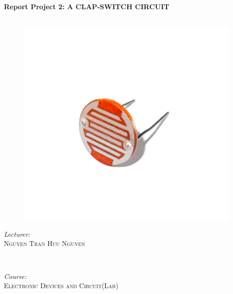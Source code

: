 \documentclass[12pt]{extarticle}
\newcommand{\<}{\langle}
\renewcommand{\>}{\rangle}
\theoremstyle{definition}
\begin{document}
\begin{titlepage}
\begin{figure}[ht]
		
	\end{figure}
	
	\HRule\\[0.4cm]
	
	{\huge\bfseries Report Project 2: A CLAP-SWITCH CIRCUIT}\\[0.4cm] %
	
	\HRule\\[0.5cm]
	\begin{figure}[ht]
		\begin{center}
			
			\includegraphics[scale=0.2]{sensor.jpg}\\
			
		\end{center}
	\end{figure}
	
	\begin{minipage}{0.5\textwidth}
		\begin{flushleft}
			\large
			\textit{Lecturer: }\\
			 \textsc{Nguyen Tran Huu Nguyen} %
		\end{flushleft}
	\end{minipage}
	~
	\begin{minipage}{0.4\textwidth}
		\begin{flushright}
			\large
			\textit{Course:}\\
			 \textsc{Electronic Devices and Circuit(Lab)} %
		\end{flushright}
	\end{minipage}
	

\end{titlepage}
\end{document}
